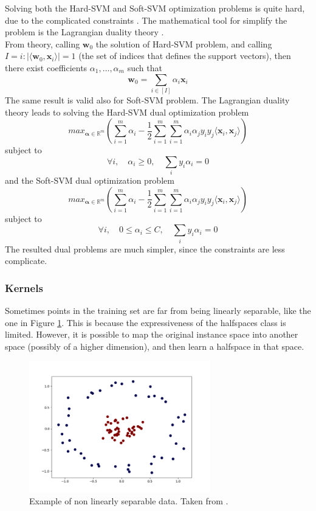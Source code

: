Solving both the Hard-\ac{SVM} and Soft-\ac{SVM} optimization problems is quite hard, due to the complicated constraints \cite{Bottou06supportvector}. The mathematical tool for simplify the problem is the Lagrangian duality theory \cite{1886529043}.\\
From theory, calling $\mathbf{w}_0$ the solution of Hard-\ac{SVM} problem, and calling $I = {i : |\langle \mathbf{w}_0, \mathbf{x}_i \rangle| = 1}$ (the set of indices that defines the support vectors), then there exist coefficients $\alpha_1, \dots, \alpha_m$ such that
\[ \mathbf{w}_0 = \sum_{i \in [I]} \alpha _i \mathbf{x}_i \]
The same result is valid also for Soft-\ac{SVM} problem. The Lagrangian duality theory leads to solving the Hard-\ac{SVM} dual optimization problem
\[ max_{\mathbf{\alpha} \in \mathbb{R}^m} \left( \sum_{i=1}^{m} \alpha_i -\frac{1}{2} \sum_{i=1}^{m} \sum_{i=1}^{m} \alpha_i \alpha_j y_i y_j \langle \mathbf{x}_i, \mathbf{x}_j \rangle \right) \]
subject to
\[ \forall i, \quad \alpha_i \ge 0 , \quad \sum_i y_i \alpha_i = 0 \]
and the Soft-\ac{SVM} dual optimization problem
\[ max_{\mathbf{\alpha} \in \mathbb{R}^m} \left( \sum_{i=1}^{m} \alpha_i -\frac{1}{2} \sum_{i=1}^{m} \sum_{i=1}^{m} \alpha_i \alpha_j y_i y_j \langle \mathbf{x}_i, \mathbf{x}_j \rangle \right) \]
subject to
\[ \forall i, \quad 0 \le \alpha_i \le C , \quad \sum_i y_i \alpha_i = 0 \]
The resulted dual problems are much simpler, since the constraints are less complicate.\\

\subsubsection{Kernels}

Sometimes points in the training set are far from being linearly separable, like the one in Figure \ref{fig:kernel}. This is because the expressiveness of the halfspaces class is limited. However, it is possible to map the original instance space into another space (possibly of a higher dimension), and then learn a halfspace in that space.

\begin{figure}[ht]
	\centering
	\includegraphics[width=0.7\textwidth]{figures/kernel.png}
	\caption{Example of non linearly separable data. Taken from \cite{non-linearly-sep}.}
	\label{fig:kernel}
\end{figure}

